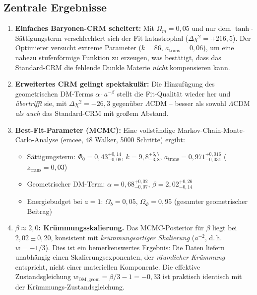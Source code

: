 \documentclass[aps,prd,twocolumn,superscriptaddress,nofootinbib]{revtex4-2}
\begin{document}
\subsection{Zentrale Ergebnisse}

\begin{enumerate}
\item \textbf{Einfaches Baryonen-CRM scheitert:} Mit $\Omega_m = 0{,}05$ und nur dem $\tanh$-S\"attigungsterm verschlechtert sich der Fit katastrophal ($\Delta\chi^2 = +216{,}5$). Der Optimierer versucht extreme Parameter ($k = 86$, $a_{\mathrm{trans}} = 0{,}06$), um eine nahezu stufenf\"ormige Funktion zu erzeugen, was best\"atigt, dass das Standard-CRM die fehlende Dunkle Materie \textit{nicht} kompensieren kann.

\item \textbf{Erweitertes CRM gelingt spektakul\"ar:} Die Hinzuf\"ugung des geometrischen DM-Terms $\alpha \cdot a^{-\beta}$ stellt die Fit-Qualit\"at wieder her und \textit{\"ubertrifft} sie, mit $\Delta\chi^2 = -26{,}3$ gegen\"uber $\Lambda$CDM -- besser als sowohl $\Lambda$CDM \textit{als auch} das Standard-CRM mit gro\ss{}em Abstand.

\item \textbf{Best-Fit-Parameter (MCMC):} Eine vollst\"andige Markov-Chain-Monte-Carlo-Analyse (emcee, 48 Walker, 5000 Schritte) ergibt:
\begin{itemize}
\item S\"attigungsterm: $\Phi_0 = 0{,}43^{+0{,}14}_{-0{,}08}$, $k = 9{,}8^{+6{,}7}_{-3{,}8}$, $a_{\mathrm{trans}} = 0{,}971^{+0{,}016}_{-0{,}031}$ ($z_{\mathrm{trans}} = 0{,}03$)
\item Geometrischer DM-Term: $\alpha = 0{,}68^{+0{,}02}_{-0{,}07}$, $\beta = 2{,}02^{+0{,}26}_{-0{,}14}$
\item Energiebudget bei $a = 1$: $\Omega_b = 0{,}05$, $\Omega_\Phi = 0{,}95$ (gesamter geometrischer Beitrag)
\end{itemize}

\item \textbf{$\beta \approx 2{,}0$: Kr\"ummungsskalierung.} Das MCMC-Posterior f\"ur $\beta$ liegt bei $2{,}02 \pm 0{,}20$, konsistent mit \textit{kr\"ummungsartiger Skalierung} ($a^{-2}$, d.\,h.\ $w = -1/3$). Dies ist ein bemerkenswertes Ergebnis: Die Daten liefern unabh\"angig einen Skalierungsexponenten, der \textit{r\"aumlicher Kr\"ummung} entspricht, nicht einer materiellen Komponente. Die effektive Zustandsgleichung $w_{\mathrm{DM,geom}} = \beta/3 - 1 = -0{,}33$ ist praktisch identisch mit der Kr\"ummungs-Zustandsgleichung.


\end{enumerate}
\end{document}
